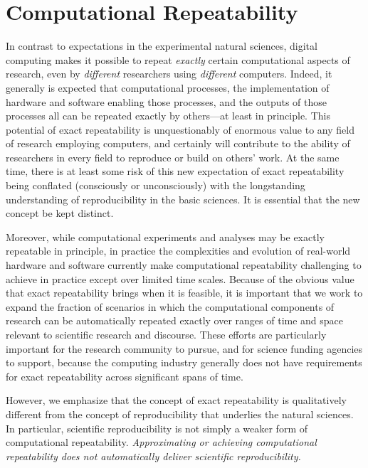 \section{Computational Repeatability}\label{sec-repeatability}

In contrast to expectations in the experimental natural sciences, digital computing makes it
	possible to repeat \emph{exactly} certain computational aspects of research, even by \emph{different}
	researchers using \emph{different} computers.
Indeed, it generally is expected that computational processes, the implementation of hardware and software
	enabling those processes, and the outputs of those processes all can be repeated exactly by others---at least in principle.
This potential of exact repeatability is unquestionably of enormous value to any field of research employing computers,
	and certainly will contribute to the ability of researchers in every field to reproduce or build on others' work.
At the same time, there is at least some risk of this new expectation of exact repeatability being conflated
	(consciously or unconsciously) with the longstanding understanding of reproducibility in the basic sciences.
It is essential that the new concept be kept distinct.

Moreover, while computational experiments and analyses may be exactly repeatable in principle,
	in practice the complexities and evolution of real-world hardware and software currently make
    computational repeatability
	challenging to achieve in practice except over limited time scales.
Because of the obvious value that exact repeatability brings when it is feasible, it is important that we work to
	expand the fraction of scenarios in which the computational components of research can be automatically
	repeated exactly over ranges of time and space relevant to scientific research and discourse.
These efforts are particularly important for the research community to pursue, and for science funding
	agencies to support, because the computing industry generally does not have requirements for exact
	repeatability across significant spans of time.

However, we emphasize that the concept of exact repeatability is
	qualitatively different from the concept of reproducibility that underlies the natural sciences.
In particular, scientific reproducibility is not simply a weaker form of computational repeatability.
\emph{Approximating or achieving computational repeatability does not automatically deliver scientific reproducibility.}

